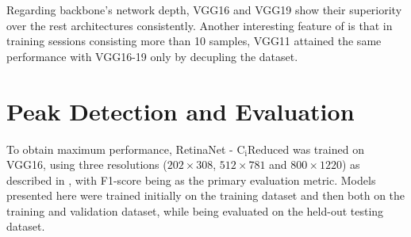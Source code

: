 Regarding backbone's network depth, VGG16 and VGG19 show their superiority over the rest architectures consistently. Another interesting feature of  is that in training sessions consisting more than 10 samples, VGG11 attained the same performance with VGG16-19 only by decupling the dataset.

\section{Peak Detection and Evaluation}
To obtain maximum performance, RetinaNet - $\text{C}_\text{i}\text{Reduced}$ was trained on VGG16, using three resolutions ($202\times308$, $512\times781$ and $800\times1220$) as described in , with F1-score being as the primary evaluation metric. Models presented here were trained initially on the training dataset and then both on the training and validation dataset, while being evaluated on the held-out testing dataset.

\begin{savenotes}
\begin{table}[!htb]
  \centering
  \caption{Comparing performance of RetinaNet - $\text{C}_\text{i}\text{Reduced}$ (VGG16), trained on the training and on the combined training - validation set, with the state-of-the-art models. Parentheses indicate resolutions. Models were evaluated on $\text{IoU}_{th}=0.2$ and $\text{NMS}_{th}=0.3$.}
  \label{tab4}
\end{table}
\end{savenotes}

